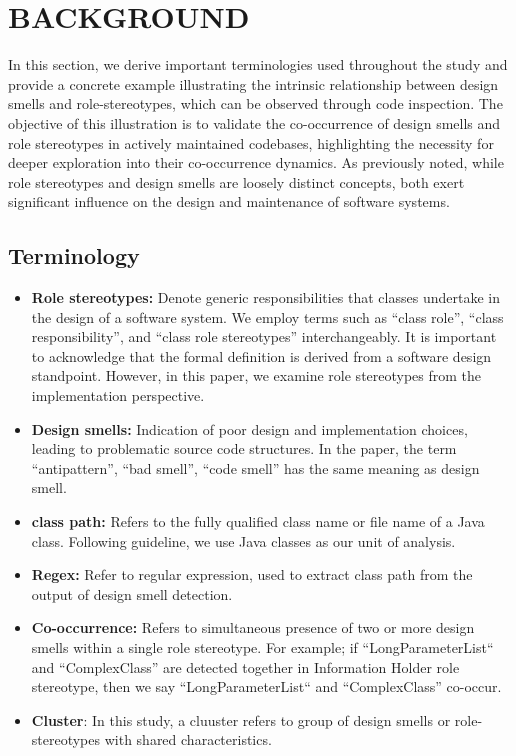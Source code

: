 \documentclass[AMA,Times1COL]{WileyNJDv5} %
\begin{document}
\section{BACKGROUND}\label{sec:terminologies}
In this section, we derive important terminologies used throughout the study and provide a concrete example illustrating the intrinsic relationship between design smells and role-stereotypes, which can be observed through code inspection.  The objective of this illustration is to validate the co-occurrence of design smells and role stereotypes in actively maintained codebases, highlighting the necessity for deeper exploration into their co-occurrence dynamics. As previously noted, while role stereotypes and design smells are loosely distinct concepts, both exert significant influence on the design and maintenance of software systems.
\subsection{Terminology}
\begin{itemize}
	\item \textbf{Role stereotypes:} Denote generic responsibilities that classes undertake in the design of a software system. We employ terms such as ``class role'', ``class responsibility'', and ``class role stereotypes'' interchangeably. It is important to acknowledge that the formal definition is derived from a software design standpoint. However, in this paper, we examine role stereotypes from the implementation perspective.
	
	\item \textbf{Design smells:} Indication of poor design and implementation choices, leading to problematic source code structures. In the paper, the term ``antipattern'', ``bad smell'', ``code smell'' has the same meaning as design smell.
	\item \textbf{class path:} Refers to the fully qualified class name or file name of a Java class. Following \cite{runeson2012case} guideline, we use Java classes as our unit of analysis.
	\item \textbf{Regex:}  Refer to regular expression, used to extract class path from the output of design smell detection.
	\item \textbf{Co-occurrence:} Refers to simultaneous presence of two or more design smells within a single role stereotype. For example; if ``LongParameterList`` and ``ComplexClass'' are detected together in Information Holder role stereotype, then we say  ``LongParameterList`` and ``ComplexClass'' co-occur.
	\item \textbf{Cluster}: In this study, a cluuster refers to group of design smells or role-stereotypes with shared characteristics.
\end{itemize}
\end{document}
